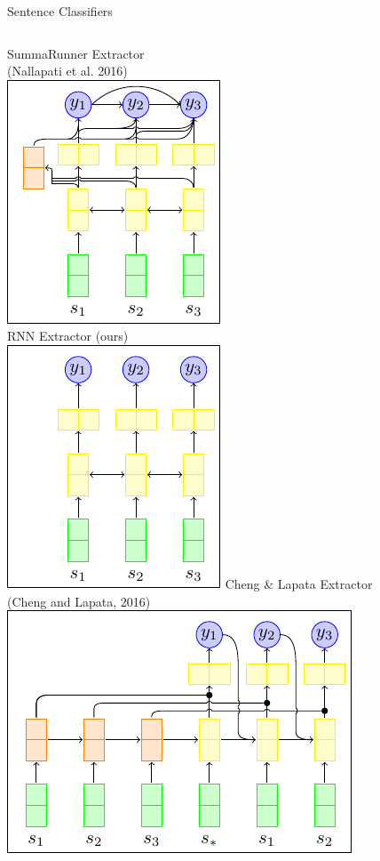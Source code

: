 \begin{frame}{Sentence Classifiers}
 \begin{columns}[t]
   \centering
   SummaRunner Extractor\\
   (Nallapati et al. 2016)\\
   \includegraphics[scale=.65]{images/section3/sr_extractor.pdf}\\
   RNN Extractor (ours)\\
   \includegraphics[scale=.65]{images/section3/rnn_extractor.pdf}
   \centering
   Cheng \& Lapata Extractor\\
   (Cheng and Lapata, 2016)\\
   \includegraphics[scale=.65]{images/section3/cl_extractor.pdf}\\

\end{columns}
\end{frame}

